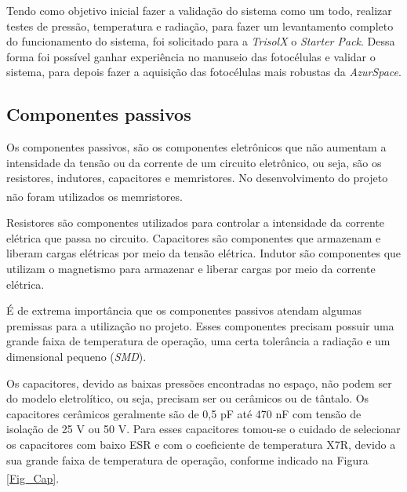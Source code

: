 \documentclass[
	12pt,				%
	openright,			%
	oneside,			%
	a4paper,			%
	english,			%
	french,				%
	spanish,			%
	brazil,				%
	oldfontcommands
	]{abntex2}
\begin{document}
	Tendo como objetivo inicial fazer a validação do sistema como um todo, realizar testes de pressão, temperatura e radiação, para fazer um levantamento completo do funcionamento do sistema, foi solicitado para a \textit{TrisolX} o \textit{Starter Pack}. Dessa forma foi possível ganhar experiência no manuseio das fotocélulas e validar o sistema, para depois fazer a aquisição das fotocélulas mais robustas da \textit{AzurSpace}.
	
\subsection[Componentes passivos]{Componentes passivos}

	Os componentes passivos, são os componentes eletrônicos que não aumentam a intensidade da tensão ou da corrente de um circuito eletrônico, ou seja, são os resistores, indutores, capacitores e memristores. No desenvolvimento do projeto não foram utilizados os memristores.\textsuperscript{\cite{Passivo}}
	
	Resistores são componentes utilizados para controlar a intensidade da corrente elétrica que passa no circuito. Capacitores são componentes que armazenam e liberam cargas elétricas por meio da tensão elétrica. Indutor são componentes que utilizam o magnetismo para armazenar e liberar cargas por meio da corrente elétrica.

	É de extrema importância que os componentes passivos atendam algumas premissas para a utilização no projeto. Esses componentes precisam possuir uma grande faixa de temperatura de operação, uma certa tolerância a radiação e um dimensional pequeno (\textit{SMD}).
	
	Os capacitores, devido as baixas pressões encontradas no espaço, não podem ser do modelo eletrolítico, ou seja, precisam ser ou cerâmicos ou de tântalo. Os capacitores cerâmicos geralmente são de 0,5 pF até 470 nF com tensão de isolação de 25 V ou 50 V. Para esses capacitores tomou-se o cuidado de selecionar os capacitores com baixo ESR e com o coeficiente de temperatura X7R, devido a sua grande faixa de temperatura de operação, conforme indicado na Figura \ref{Fig_Cap}.\textsuperscript{\cite{x7r}}
	
\end{document}
